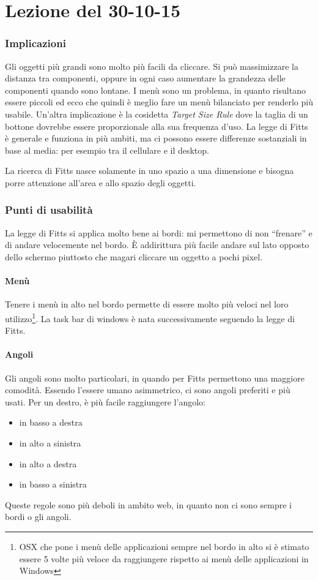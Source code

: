 \section{Lezione del 30-10-15}
\graphicspath{ {res/data/30-10-15/} }

\subsubsection{Implicazioni}

Gli oggetti pi\`u grandi sono molto pi\`u  facili da cliccare. Si pu\`o massimizzare la distanza tra componenti, oppure in ogni caso aumentare la grandezza delle componenti quando sono lontane.
I men\`u sono un problema, in quanto risultano essere piccoli ed ecco che quindi \`e meglio fare un men\`u bilanciato per renderlo pi\`u usabile.
Un'altra implicazione \`e la cosidetta \textit{Target Size Rule} dove la taglia di un bottone dovrebbe essere proporzionale alla sua frequenza d'uso.
La legge di Fitts \`e generale e funziona in pi\`u ambiti, ma ci possono essere differenze sostanziali in base al media: per esempio tra il cellulare e il desktop.

La ricerca di Fitts nasce solamente in uno spazio a una dimensione e bisogna porre attenzione all'area e allo spazio degli oggetti.

\subsubsection{Punti di usabilit\`a} La legge di Fitts si applica molto bene ai bordi: mi permettono di non ``frenare'' e di andare velocemente nel bordo. \`E addirittura pi\`u facile andare sul lato opposto dello schermo piuttosto che magari cliccare un oggetto a pochi pixel.
\paragraph*{Men\`u}Tenere i men\`u in alto nel bordo permette di essere molto pi\`u veloci nel loro utilizzo\footnote{OSX che pone i men\`u delle applicazioni sempre nel bordo in alto si \`e stimato essere 5 volte pi\`u veloce da raggiungere rispetto ai men\`u delle applicazioni in Windows}. La task bar di windows \`e nata successivamente seguendo la legge di Fitts.
\paragraph{Angoli}Gli angoli sono molto particolari, in quando per Fitts permettono una maggiore comodit\`a. Essendo l'essere umano asimmetrico, ci sono angoli preferiti e pi\`u usati. Per un destro, \`e pi\`u facile raggiungere l'angolo:
\begin{itemize}
\item in basso a destra
\item in alto a sinistra
\item in alto a destra
\item in basso a sinistra
\end{itemize}
Queste regole sono pi\`u deboli in ambito web, in quanto non ci sono sempre i bordi o gli angoli.
